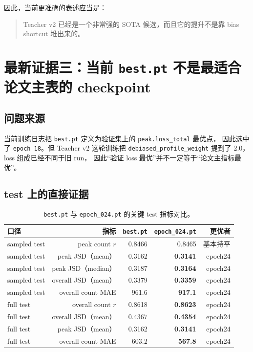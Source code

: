 \documentclass[11pt,a4paper]{ctexart}
\begin{document}
因此，当前更准确的表述应当是：
\begin{quote}
Teacher v2 已经是一个非常强的 SOTA 候选，而且它的提升不是靠 bias shortcut 堆出来的。
\end{quote}

\section{最新证据三：当前 \texttt{best.pt} 不是最适合论文主表的 checkpoint}

\subsection{问题来源}

当前训练日志把 \texttt{best.pt} 定义为验证集上的 \texttt{peak.loss\_total} 最优点，
因此选中了 \texttt{epoch 18}。但 Teacher v2 这轮训练把
\texttt{debiased\_profile\_weight} 提到了 2.0，loss 组成已经不同于旧 run，
因此“验证 loss 最优”并不一定等于“论文主指标最优”。

\subsection{test 上的直接证据}

\begin{table}[H]
\centering
\small
\caption{\texttt{best.pt} 与 \texttt{epoch\_024.pt} 的关键 test 指标对比。}
\begin{tabular}{lrrrr}
\toprule
口径 & 指标 & \texttt{best.pt} & \texttt{epoch\_024.pt} & 更优者 \\
\midrule
sampled test & peak count $r$ & 0.8466 & 0.8465 & 基本持平 \\
sampled test & peak JSD（mean） & 0.3162 & \textbf{0.3141} & epoch24 \\
sampled test & peak JSD（median） & 0.3187 & \textbf{0.3164} & epoch24 \\
sampled test & overall JSD（mean） & 0.3379 & \textbf{0.3359} & epoch24 \\
sampled test & overall count MAE & 961.6 & \textbf{917.1} & epoch24 \\
\midrule
full test & overall count $r$ & 0.8618 & \textbf{0.8623} & epoch24 \\
full test & overall JSD（mean） & 0.4367 & \textbf{0.4354} & epoch24 \\
full test & peak JSD（mean） & 0.3162 & \textbf{0.3141} & epoch24 \\
full test & overall count MAE & 603.2 & \textbf{567.8} & epoch24 \\
\bottomrule
\end{tabular}
\end{table}
\end{document}
